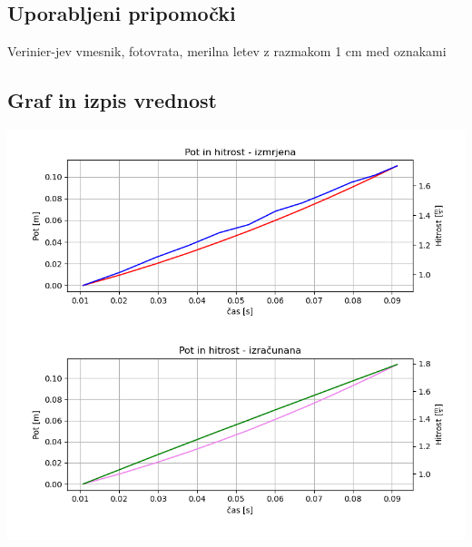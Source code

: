 \documentclass[12pt]{article}
\begin{document}
 	\subsection*{Uporabljeni pripomočki}
	Verinier-jev vmesnik, fotovrata, merilna letev z razmakom 1 cm med oznakami
	\vspace{\fill}

 	\subsection*{Graf in izpis vrednost}

	\includegraphics[width=\linewidth]{slike/graf_v2_1.png}
\end{document}
